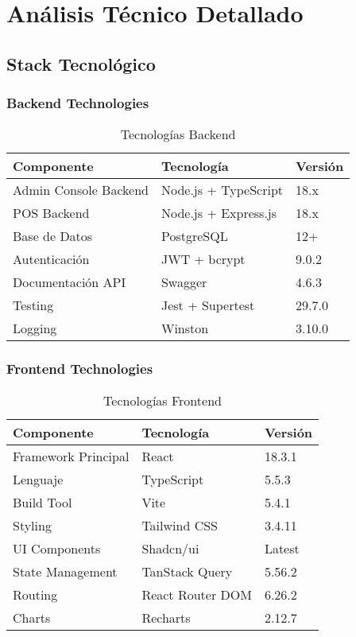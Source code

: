\documentclass[12pt,a4paper]{article}
\begin{document}
\section{Análisis Técnico Detallado}

\subsection{Stack Tecnológico}

\subsubsection{Backend Technologies}

\begin{table}[H]
\centering
\begin{tabular}{|l|l|l|}
\hline
\textbf{Componente} & \textbf{Tecnología} & \textbf{Versión} \\
\hline
Admin Console Backend & Node.js + TypeScript & 18.x \\
POS Backend & Node.js + Express.js & 18.x \\
Base de Datos & PostgreSQL & 12+ \\
Autenticación & JWT + bcrypt & 9.0.2 \\
Documentación API & Swagger & 4.6.3 \\
Testing & Jest + Supertest & 29.7.0 \\
Logging & Winston & 3.10.0 \\
\hline
\end{tabular}
\caption{Tecnologías Backend}
\end{table}

\subsubsection{Frontend Technologies}

\begin{table}[H]
\centering
\begin{tabular}{|l|l|l|}
\hline
\textbf{Componente} & \textbf{Tecnología} & \textbf{Versión} \\
\hline
Framework Principal & React & 18.3.1 \\
Lenguaje & TypeScript & 5.5.3 \\
Build Tool & Vite & 5.4.1 \\
Styling & Tailwind CSS & 3.4.11 \\
UI Components & Shadcn/ui & Latest \\
State Management & TanStack Query & 5.56.2 \\
Routing & React Router DOM & 6.26.2 \\
Charts & Recharts & 2.12.7 \\
\hline
\end{tabular}
\caption{Tecnologías Frontend}
\end{table}
\end{document}
